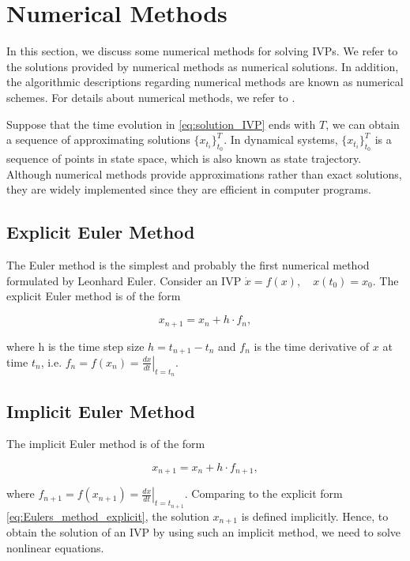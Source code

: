 \documentclass[
	parskip, 			   %
	twoside, 			   %
	DIV=14, 			   %
	BCOR=15.0mm, 		   %
	headsepline, 		   %
	open=right, 		   %
	captions=tableheading, %
	bibliography=totoc,    %
	numbers=noenddot       %
]{scrreprt}
\begin{document}
\clearpage
\section{Numerical Methods}
In this section, we discuss some numerical methods for solving IVPs. We refer to the solutions provided by numerical methods as numerical solutions. In addition, the algorithmic descriptions regarding numerical methods are known as numerical schemes. For details about numerical methods, we refer to \cite{hairer2006geometric}.

Suppose that the time evolution in \ref{eq:solution_IVP} ends with $T$, we can obtain a sequence of approximating solutions $ \{ x_{t_{i}} \}_{t_{0}}^{T}$. In dynamical systems, $ \{ x_{t_{i}} \}_{t_{0}}^{T}$ is a sequence of points in state space, which is also known as state trajectory. Although numerical methods provide approximations rather than exact solutions, they are widely implemented since they are efficient in computer programs. 

\subsection{Explicit Euler Method}
The Euler method is the simplest and probably the first numerical method formulated by Leonhard Euler. Consider an IVP $\dot{x} = f(x), \quad x(t_{0})=x_{0}$. The explicit Euler method is of the form

\begin{equation}
    \label{eq:Eulers_method_explicit}
    x_{n+1} = x_{n} + h \cdot f_{n},
\end{equation}

where h is the time step size $h = t_{n+1} - t_{n}$ and $f_{n}$ is the time derivative of $x$ at time $t_{n}$, i.e. $f_{n} = f(x_n) = \left. \frac{dx}{dt} \right|_{t=t_n}$.

\subsection{Implicit Euler Method}
The implicit Euler method is of the form

\begin{equation}
    \label{eq:Eulers_method_implicit}
    x_{n+1} = x_{n} + h \cdot f_{n+1},
\end{equation}

where $f_{n+1} = f(x_{n+1}) = \left. \frac{dx}{dt} \right|_{t=t_{n+1}}$. Comparing to the explicit form \ref{eq:Eulers_method_explicit}, the solution $x_{n+1}$ is defined implicitly. Hence, to obtain the solution of an IVP by using such an implicit method, we need to solve nonlinear equations.
\end{document}
